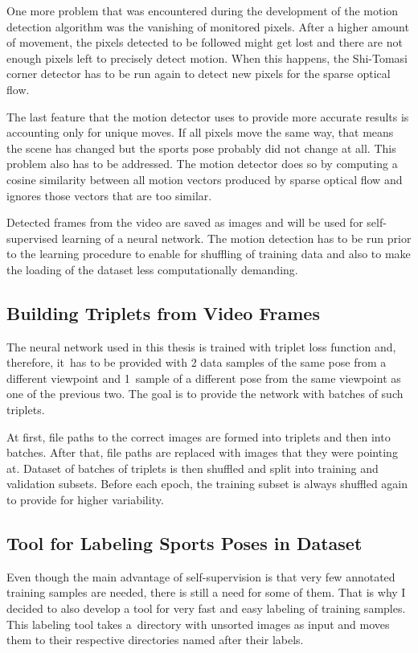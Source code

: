 One more problem that was encountered during the development of the motion detection algorithm was the vanishing of monitored pixels. After a higher amount of movement, the pixels detected to be followed might get lost and there are not enough pixels left to precisely detect motion. When this happens, the Shi-Tomasi corner detector has to be run again to detect new pixels for the sparse optical flow.

The last feature that the motion detector uses to provide more accurate results is accounting only for unique moves. If all pixels move the same way, that means the scene has changed but the sports pose probably did not change at all. This problem also has to be addressed. The motion detector does so by computing a cosine similarity between all motion vectors produced by sparse optical flow and ignores those vectors that are too similar.

Detected frames from the video are saved as images and will be used for self-supervised learning of a neural network. The motion detection has to be run prior to the learning procedure to enable for shuffling of training data and also to make the loading of the dataset less computationally demanding.

\subsection{Building Triplets from Video Frames}

The neural network used in this thesis is trained with triplet loss function and, therefore, it~has to be provided with 2 data samples of the same pose from a different viewpoint and 1~sample of a different pose from the same viewpoint as one of the previous two. The goal is to provide the network with batches of such triplets.

At first, file paths to the correct images are formed into triplets and then into batches. After that, file paths are replaced with images that they were pointing at. Dataset of batches of triplets is then shuffled and split into training and validation subsets. Before each epoch, the training subset is always shuffled again to provide for higher variability.

\subsection{\label{sec:dataset-label-tool}Tool for Labeling Sports Poses in Dataset}

Even though the main advantage of self-supervision is that very few annotated training samples are needed, there is still a need for some of them. That is why I decided to also develop a tool for very fast and easy labeling of training samples. This labeling tool takes a~directory with unsorted images as input and moves them to their respective directories named after their labels.

